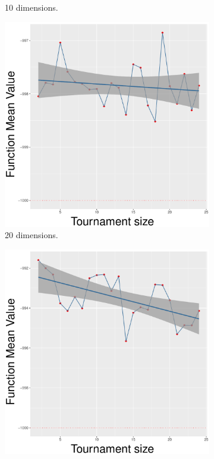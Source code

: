 \begin{figure}[!t]
\begin{subfigure}[b]{0.33\textwidth}
		\caption{10 dimensions.}
	\end{subfigure}
	\begin{subfigure}[b]{0.33\textwidth}
		\centering
		\includegraphics[width=\textwidth]{img/uniform-20D/multimodal_uniform_22_dim_20.pdf}
		\caption{20 dimensions.}
	\end{subfigure}
	\begin{subfigure}[b]{0.33\textwidth}
		\centering
		\includegraphics[width=\textwidth]{img/uniform-40D/multimodal_uniform_22_dim_40.pdf}

\end{subfigure}
\end{figure}

